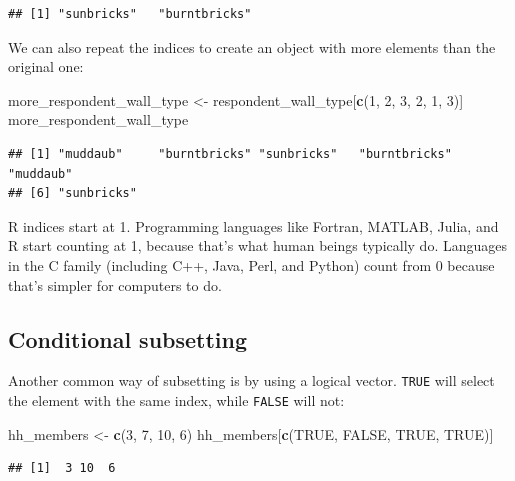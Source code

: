\documentclass[]{book}
\newenvironment{Shaded}{\begin{snugshade}}{\end{snugshade}}
\newcommand{\KeywordTok}[1]{\textcolor[rgb]{0.13,0.29,0.53}{\textbf{#1}}}
\newcommand{\DecValTok}[1]{\textcolor[rgb]{0.00,0.00,0.81}{#1}}
\newcommand{\StringTok}[1]{\textcolor[rgb]{0.31,0.60,0.02}{#1}}
\newcommand{\OtherTok}[1]{\textcolor[rgb]{0.56,0.35,0.01}{#1}}
\newcommand{\NormalTok}[1]{#1}
\begin{document}
\begin{verbatim}
## [1] "sunbricks"   "burntbricks"
\end{verbatim}

We can also repeat the indices to create an object with more elements
than the original one:

\begin{Shaded}
\begin{Highlighting}[]
\NormalTok{more_respondent_wall_type <-}\StringTok{ }\NormalTok{respondent_wall_type[}\KeywordTok{c}\NormalTok{(}\DecValTok{1}\NormalTok{, }\DecValTok{2}\NormalTok{, }\DecValTok{3}\NormalTok{, }\DecValTok{2}\NormalTok{, }\DecValTok{1}\NormalTok{, }\DecValTok{3}\NormalTok{)]}
\NormalTok{more_respondent_wall_type}
\end{Highlighting}
\end{Shaded}

\begin{verbatim}
## [1] "muddaub"     "burntbricks" "sunbricks"   "burntbricks" "muddaub"    
## [6] "sunbricks"
\end{verbatim}

R indices start at 1. Programming languages like Fortran, MATLAB, Julia,
and R start counting at 1, because that's what human beings typically
do. Languages in the C family (including C++, Java, Perl, and Python)
count from 0 because that's simpler for computers to do.

\subsection{Conditional subsetting}\label{conditional-subsetting}

Another common way of subsetting is by using a logical vector.
\texttt{TRUE} will select the element with the same index, while
\texttt{FALSE} will not:

\begin{Shaded}
\begin{Highlighting}[]
\NormalTok{hh_members <-}\StringTok{ }\KeywordTok{c}\NormalTok{(}\DecValTok{3}\NormalTok{, }\DecValTok{7}\NormalTok{, }\DecValTok{10}\NormalTok{, }\DecValTok{6}\NormalTok{)}
\NormalTok{hh_members[}\KeywordTok{c}\NormalTok{(}\OtherTok{TRUE}\NormalTok{, }\OtherTok{FALSE}\NormalTok{, }\OtherTok{TRUE}\NormalTok{, }\OtherTok{TRUE}\NormalTok{)]}
\end{Highlighting}
\end{Shaded}

\begin{verbatim}
## [1]  3 10  6
\end{verbatim}
\end{document}

